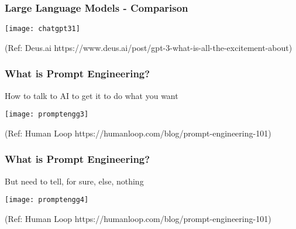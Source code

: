 \begin{frame}[fragile]\frametitle{Large Language Models - Comparison}

\begin{center}
\texttt{[image: chatgpt31]}
\end{center}				
{\tiny (Ref: Deus.ai https://www.deus.ai/post/gpt-3-what-is-all-the-excitement-about)}

\end{frame}

\begin{frame}[fragile]\frametitle{What is Prompt Engineering?}

How to talk to AI to get it to do what you want


\begin{center}
\texttt{[image: promptengg3]}

{\tiny (Ref: Human Loop https://humanloop.com/blog/prompt-engineering-101)}

\end{center}				
			
			

\end{frame}

\begin{frame}[fragile]\frametitle{What is Prompt Engineering?}

But need to tell, for sure, else, nothing


\begin{center}
\texttt{[image: promptengg4]}

{\tiny (Ref: Human Loop https://humanloop.com/blog/prompt-engineering-101)}

\end{center}				

\end{frame}


